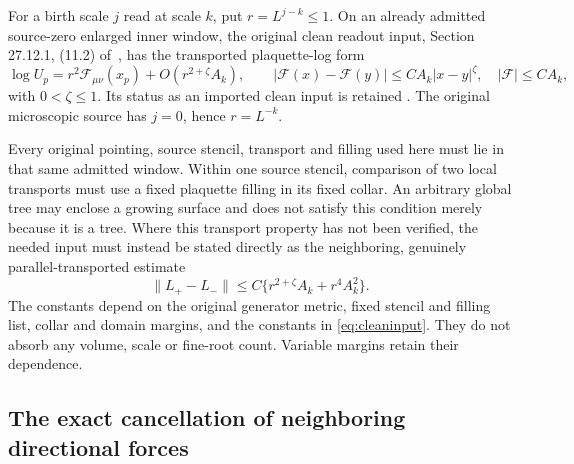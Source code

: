 \documentclass[11pt,letterpaper]{article}
\theoremstyle{remark}\newtheorem{remark}[theorem]{Remark}
\begin{document}
For a birth scale \(j\) read at scale \(k\), put \(r=L^{j-k}\le1\). On an already admitted source-zero enlarged inner window, the original clean readout input, Section 27.12.1, (11.2) of~\cite[pp.~85--87]{W}, has the transported plaquette-log form
\begin{equation}\label{eq:cleaninput}
 \log U_p=r^2\mathcal F_{\mu\nu}(x_p)
      +O(r^{2+\zeta}A_k),\qquad
 |\mathcal F(x)-\mathcal F(y)|\le CA_k|x-y|^\zeta,
 \quad |\mathcal F|\le CA_k,
\end{equation}
with \(0<\zeta\le1\). Its status as an imported clean input is retained \cite[pp.~85--87]{W}. The original microscopic source has \(j=0\), hence \(r=L^{-k}\).

Every original pointing, source stencil, transport and filling used here must lie in that same admitted window. Within one source stencil, comparison of two local transports must use a fixed plaquette filling in its fixed collar. An arbitrary global tree may enclose a growing surface and does not satisfy this condition merely because it is a tree. Where this transport property has not been verified, the needed input must instead be stated directly as the neighboring, genuinely parallel-transported estimate
\begin{equation}\label{eq:cleanlogs}
 \|L_+-L_-\|\le C\{r^{2+\zeta}A_k+r^4A_k^2\}.
\end{equation}
The constants depend on the original generator metric, fixed stencil and filling list, collar and domain margins, and the constants in \eqref{eq:cleaninput}. They do not absorb any volume, scale or fine-root count. Variable margins retain their dependence.

\subsection{The exact cancellation of neighboring directional forces}
\end{document}
